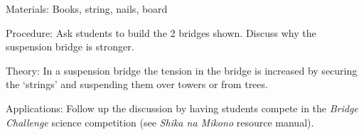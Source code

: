 \begin{multicols}{2}
\begin{description*}
\item[Materials:]{Books, string, nails, board}
\item[Procedure:]{Ask students to build the 2
bridges shown. Discuss why the
suspension bridge is stronger.}
\item[Theory:]{In a suspension bridge the tension
in the bridge is increased by
securing the `strings' and
suspending them over towers or
from trees.}
\item[Applications:]{Follow up the discussion by having students compete in the \emph{Bridge Challenge} science competition (see \emph{Shika na Mikono} resource manual).}
\end{description*}


\end{multicols}

\pagebreak